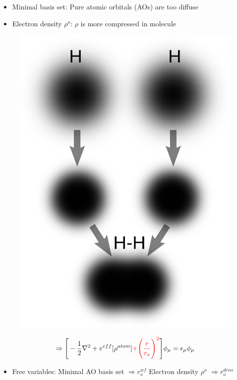 \begin{itemize}
  \item Minimal basis set:
    \subitem Pure atomic orbitals (AOs) are too diffuse%
  \item Electron density $\rho^o$:
    \subitem  $\rho$ is more compressed in molecule
\end{itemize} 

\begin{figure}[H]
  \centering
  \label{fig:h2}
  \includegraphics[scale=0.2,angle=0]{h2.eps}
\end{figure}

\begin{equation} 
  \Rightarrow  \Bigg[ -\frac{1}{2}\nabla^2 + v^{eff} [ \rho^{atom} ] {\color{red} + \Bigg(\frac{r}{r_o}\Bigg)^2} \Bigg]\phi_\mu=\epsilon_\mu\phi_\mu 
\end{equation}
\begin{itemize}
  \item[] Free variables:
    \subitem Minimal AO basis set $\Rightarrow r_o^{wf}$
    \subitem Electron density $\rho^o$ $\Rightarrow r_o^{dens}$
\end{itemize}

